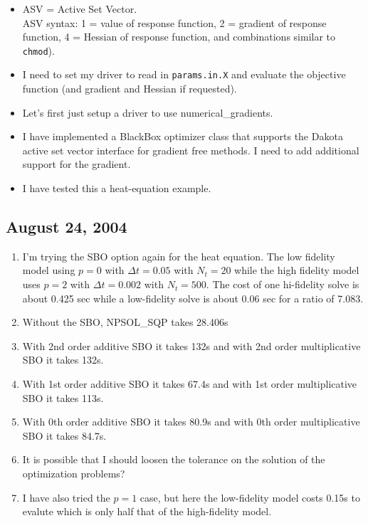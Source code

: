 \documentclass[12pt]{article}
\begin{document}
\begin{itemize}
\item ASV = Active Set Vector.  \\ ASV syntax: 1 = value of response function,
  2 = gradient of response function, 4 = Hessian of response function, and
  combinations similar to {\tt chmod}).

\item I need to set my driver to read in {\tt params.in.X} and evaluate the
  objective function (and gradient and Hessian if requested).

\item Let's first just setup a driver to use numerical\_gradients.

\item I have implemented a BlackBox optimizer class that supports the Dakota
  active set vector interface for gradient free methods.  I need to add
  additional support for the gradient.

\item I have tested this a heat-equation example.
\end{itemize}

\subsection{August 24, 2004}

\begin{enumerate}
\item I'm trying the SBO option again for the heat equation.  The low fidelity
model using $p=0$ with $\Delta t=0.05$ with $N_t=20$ while the high fidelity
model uses $p=2$ with $\Delta t=0.002$ with $N_t=500$.  The cost of one
hi-fidelity solve is about 0.425 sec while a low-fidelity solve is about 0.06
sec for a ratio of 7.083.

\item Without the SBO, NPSOL_SQP takes 28.406s 

\item With 2nd order additive SBO it takes 132s and with 2nd order
multiplicative SBO it takes 132s.

\item With 1st order additive SBO it takes 67.4s and with 1st order
multiplicative SBO it takes 113s.

\item With 0th order additive SBO it takes 80.9s and with 0th order
multiplicative SBO it takes 84.7s.

\item It is possible that I should loosen the tolerance on the solution of the
optimization problems?

\item I have also tried the $p=1$ case, but here the low-fidelity model costs
0.15s to evalute which is only half that of the high-fidelity model.
\end{enumerate}
\end{document}

